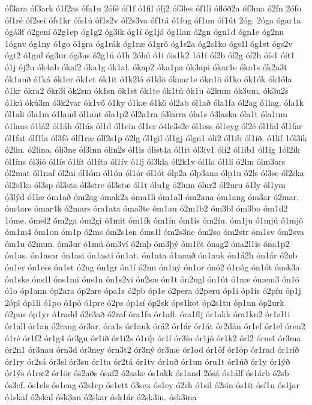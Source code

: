 {óf3ara
óf3ark
ó1f2as
ófa1u
2ófé
óf1f
ó1fil
ófj2
óf3les
óf1lí
óflóð2a
óf3ma
ó2fn
2ófo
óf1ré
óf2sei
ófs1kr
ófs1ú
óf1s2v
óf2s3va
óf1tá
ó1fug
óf1un
óf1út
2óg.
2óga
ógar1a
ógá3f
ó2gení
ó2g1ep
óg1g2
óg3ik
óg1í
óg1já
óg1lan
ó2gn
ógn1d
ógn1e
óg2nu
1ógnv
óg1ny
ó1go
ó1gra
óg1rák
óg1ræ
ó1grö
óg1s2a
óg2s1ko
ógs1l
óg1st
ógs2v
ógt2
ó1gul
óg3ur
óg3us
ó2g1ú
ó1h
2óhú
ó1i
óis1k2
1ó1í
óí2b
óí2g
óí2h
óís1
óít1
ó1j
ój2u
ók4ab
ókaf2
óka1g
ók1al.
ókap2
óka1pa
ók3api
ókar1e
óka1s
ók2a3t
ók1auð
ó1ká
ók1er
ók1et
ók1it
ó1k2ló
ó1klö
óknar1e
ókn1ö
ó1ko
ók1ók
ók1óla
ó1kr
ókra2
ókr3í
ók2sm
ók1sn
ók1st
ók1te
ók1tú
ók1u
ó2kum
ók3um.
ók3u2s
ó1kú
ókú3m
ó3k2var
ók1vö
ó1ky
ó1kæ
ó1kö
ól2ab
ól1að
óla1fa
ól2ag
ó1lag.
óla1k
ól1ali
óla1m
ó1land
ól1ant
óla1p2
ól2a1ra
ó3larra
óla1s
ó3laska
óla1t
óla1um
ó1laus
ó1lá2
ól1áh
ól1ás
ól1d
ól1ein
ól1er
ó4le3s2e
ól1ess
ól1eyg
ól2é
ól1fal
ól1far
ól1fat
ólf1la
ól3fó
ólf1ræ
ólf2s1p
ó2lg
ól1gil
ól1gj
ólgn1
óli2
ól1ib
ól1ið.
ó1lif
1ól3ik
ó2lin.
ó2lina.
óli3ne
ól3inn
ólin2s
ól1is
ólist4a
ól1it
ól3iv1
ólí2
ól1íb1
ól1íg
1ól2ík
ól1íns
ól3íó
ól1ís
ó1lít
ól1íta
ól1ív
ó1lj
ól3kla
ól2k1v
ól1la
ól1lí
ó2lm
ólm3ars
ól2mat
ól1naf
ól2ni
ól1óm
ól1ón
ól1ór
ól1ót
ólp2a
ólp3ana
ólp1u
ó2ls
ól3se
ól2ska
ól2s1ko
ól3sp
ól3sta
ól3stre
ól3stæ
ól1t
ólu1g
ó2lum
ólur2
ól2uru
ó1ly
ól1ym
ó3lýd
ó1læ
óm1að
óm2ag
ómak2a
óma1li
óm1all
óm2ana
óm1ang
óm3ar
ó2mar.
óm4are
ómar4k
ó2mars
óm1ata
óma3te
óm1au
ó2m1b2
óm3bl
óm3bo
óm1d2
1óme.
ómel2
óm2ga
óm2gi
ó1mit
óm1ík
óm1ín
óm1ís
óm2íu.
óm1ju
ó1mjú
ó1mjö
óm1m4
óm1on
óm1p
ó2ms
óm2s1en
óms1l
óm2s3ne
óm2so
óm2str
óm1sv
óm2sva
óm1u
ó2mun.
óm3ur
ó1mú
óm3ví
ó2mþ
óm3þý
óm1öt
ónag2
óna2l1is
óna1p2
ón1as.
ón1asar
ón1asi
ón1asti
ón1at.
ón1ata
ó1nauð
ón1auk
ón1á2h
ón1ár
ó2nb
ón1er
ón1ess
ón1et
ó2ng
ón1gr
ón1í
ó2nn
ón1ný
ón1or
ónó2
ó1nóg
ón1ót
ónsk3a
ón1ske
óns1l
óns1mi
óns1n
ón1s2vi
ón2sæ
ón1t
ón2ugl
ón1út
ó1næ
ónæm3
ón1ö
ó1o
óp1ann
óp2ara
óp2are
ópa1s
ó2pb
óp1e
ó2pera
ó2peru
óp1i
óp1ís
ó2píu
óp1j
2ópl
óp1li
ó1po
ó1pó
ó1pre
ó2ps
óp1sí
óp2sk
óps1kot
óp2s1tu
óp1un
óp2urk
ó2pus
óp1yr
ó1radd
ó2r3að
ó2raf
óra1fa
ór1afl.
óra1flj
ór1akk
óra1kn2
ór1al1i
ór1all
ór1an
ó2rang
ór3ar.
óra1s
ór1auk
órá2
ór1ár
ór1át
ór2dán
ór1ef
ór1el
óren2
ó1ré
ór1f2
ór1g4
ór3gu
ór1ið
ór1i2s
ó1riþ
ór1í
ór3ío
ór1jó
ór1k2
órl2
órm4
ór3ma
ór2n1
ór3nau
órn3d
ór3ney
órn3t2
ór3ný
ór3næ
ór1od
ór1óf
ór1óp
ór1rad
ór1rið
ór1ry
ór2sá
ór3sl
ór3su
ór1ta
ór2tá
ór1tv
ór1uð
ór1un
óru1t
ór1úð
ór1y
ór1ýð
ór1ýs
ó1ræ2
ór1ör
ós2aðs
ósaf2
ó2sake
ós1akk
ós1and
2ósá
ós1álf
ós1árb
ó2sb
ós3ef.
ós1els
ós1eng
ó2s1ep
ós1ett
ó3sex
ós1ey
ó2sh
ó1sil
ó2sin
ós1it
ósí1u
ós1jar
ó1skaf
ó2skal
ósk3an
ó2skar
ósk1ár
ó2sk3in.
ósk3ina
}
